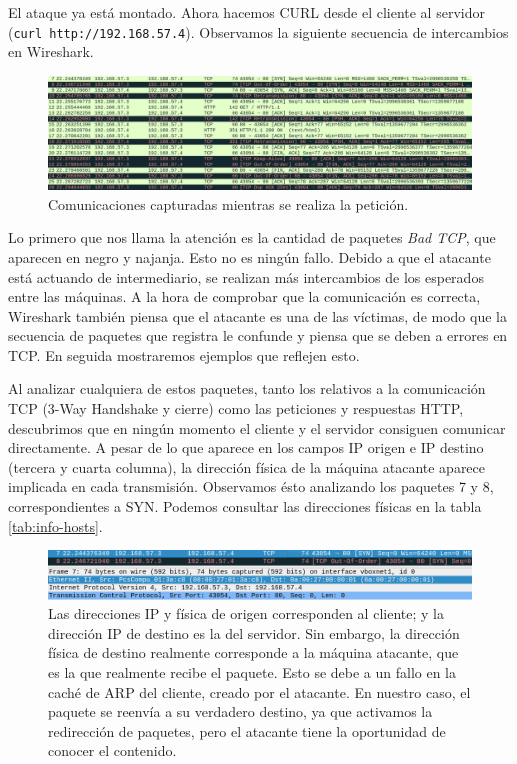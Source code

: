 \documentclass[11pt]{article}
\begin{document}
El ataque ya está montado. Ahora hacemos CURL desde el cliente al servidor (\verb|curl http://192.168.57.4|).
Observamos la siguiente secuencia de intercambios en Wireshark.

\begin{figure}[H]
	\centering
	\includegraphics[width=170mm]{images/atack1/request}
	\caption{Comunicaciones capturadas mientras se realiza la petición.}
	\label{fig:request}
\end{figure}

Lo primero que nos llama la atención es la cantidad de paquetes \emph{Bad TCP}, que aparecen en negro y najanja. Esto
no es ningún fallo. Debido a que el atacante está actuando de intermediario, se realizan más intercambios de los esperados
entre las máquinas. A la hora de comprobar que la comunicación es correcta, Wireshark también piensa que el atacante es
una de las víctimas, de modo que la secuencia de paquetes que registra le confunde y piensa que se deben a errores en TCP. En 
seguida mostraremos ejemplos que reflejen esto.

Al analizar cualquiera de estos paquetes, tanto los relativos a la comunicación TCP (3-Way Handshake y cierre) como las peticiones y
respuestas HTTP, descubrimos que en ningún momento el cliente y el servidor consiguen comunicar directamente. A pesar de lo que aparece
en los campos IP origen e IP destino (tercera y cuarta columna), la dirección física de la máquina atacante aparece implicada
en cada transmisión. Observamos ésto analizando los paquetes 7 y 8, correspondientes a SYN. Podemos consultar las direcciones físicas en
la tabla \ref{tab:info-hosts}.

\begin{figure}[H]
	\centering
	\includegraphics[width=160mm]{images/atack1/syn-client-atacker}
	\caption{Las direcciones IP y física de origen corresponden al cliente; y la dirección IP de destino es la del servidor. Sin embargo,
	la dirección física de destino realmente corresponde a la máquina atacante, que es la que realmente recibe el paquete. Esto se debe
	a un fallo en la caché de ARP del cliente, creado por el atacante. En nuestro caso, el paquete se reenvía a su verdadero destino,
	ya que activamos la redirección de paquetes, pero el atacante tiene la oportunidad de conocer el contenido.}
	\label{fig:syn-client-atacker}
\end{figure}
\end{document}
